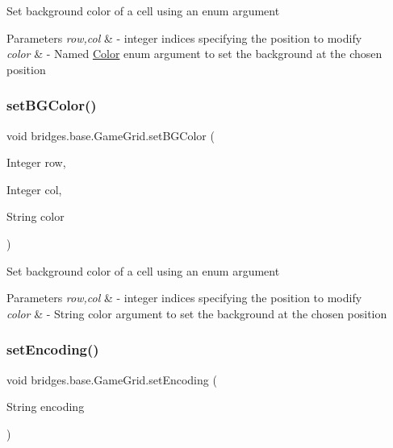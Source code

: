 Set background color of a cell using an enum argument


\begin{DoxyParams}{Parameters}
{\em row,col} & -\/ integer indices specifying the position to modify \\
\hline
{\em color} & -\/ Named \mbox{\hyperlink{classbridges_1_1base_1_1_color}{Color}} enum argument to set the background at the chosen position \\
\hline
\end{DoxyParams}
\mbox{\label{classbridges_1_1base_1_1_game_grid_ad655bef3f2c24cc19f222b86b5d31373}} 
\subsubsection{\texorpdfstring{set\+B\+G\+Color()}{setBGColor()}\hspace{0.1cm}{\footnotesize\ttfamily [2/2]}}
{\footnotesize\ttfamily void bridges.\+base.\+Game\+Grid.\+set\+B\+G\+Color (\begin{DoxyParamCaption}\item[{Integer}]{row,  }\item[{Integer}]{col,  }\item[{String}]{color }\end{DoxyParamCaption})}

Set background color of a cell using an enum argument


\begin{DoxyParams}{Parameters}
{\em row,col} & -\/ integer indices specifying the position to modify \\
\hline
{\em color} & -\/ String color argument to set the background at the chosen position \\
\hline
\end{DoxyParams}
\mbox{\label{classbridges_1_1base_1_1_game_grid_a2281cfd7d61dc9903c9b1358c9767a1e}} 
\subsubsection{\texorpdfstring{set\+Encoding()}{setEncoding()}}
{\footnotesize\ttfamily void bridges.\+base.\+Game\+Grid.\+set\+Encoding (\begin{DoxyParamCaption}\item[{String}]{encoding }\end{DoxyParamCaption})}



